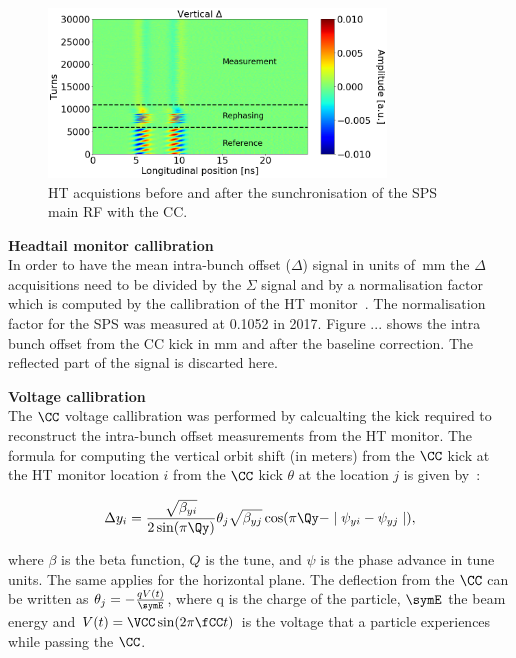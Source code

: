 \begin{figure}[!h]
   \centering         
   \includegraphics[width=0.8\textwidth]{images/Ch4/HT_measures_vs_reference_vs_corrected__20180530_114730_baseline_correction_onlyDelta.png}
       \caption{HT acquistions before and after the sunchronisation of the SPS main RF with the CC.}
       \label{fig:HT_baseline_correction_measurements_2D}
\end{figure}

\normalsize{\textbf{Headtail monitor callibration}}\\
In order to have the mean intra-bunch offset ($\Delta$) signal in units of \,mm the $\Delta$ acquisitions need to be divided by the $\Sigma$ signal and by a normalisation factor which is computed by the callibration of the HT monitor~\cite{PhysRevAccelBeams.22.112803}. The normalisation factor for the SPS was measured at 0.1052 in 2017. %
Figure ... shows the intra bunch offset from the CC kick in mm and after the baseline correction. The reflected part of the signal is discarted here.
 




\normalsize{\textbf{Voltage callibration}}\\
The $\CC$ voltage callibration was performed by calcualting the kick required to reconstruct the intra-bunch offset measurements from the HT monitor. The formula for computing the vertical orbit shift (in meters) from the $\CC$ kick at the HT monitor location $i$ from the $\CC$ kick $\theta$ at the location $j$ is given by~\cite{Carver:2696108, Chao:1490001}:

\begin{equation}
   \Delta y_i  = \frac{\sqrt{\beta_{yi}}}{2 \sin(\pi \Qy)} \theta_j \sqrt{\beta_{yj}} \cos(\pi \Qy - \mid \psi_{yi} - \psi_{yj} \mid),
\end{equation}

where $\beta$ is the beta function, $Q$ is the tune, and $\psi$ is the phase advance in tune units. The same applies for the horizontal plane. The deflection from the $\CC$ can be written as $\theta_j = - \frac{q V(t)}{\symE}$, where q is the charge of the particle, $\symE$ the beam energy and $V(t) = \VCC \sin(2 \pi \fCC t) $ is the voltage that a particle experiences while passing the $\CC$. 

